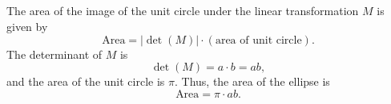 \documentclass{article}
\begin{document}
\subsection{}
The area of the image of the unit circle under the linear transformation $M$ is given by \[ \text{Area} = |\det(M)| \cdot (\text{area of unit circle}). \] The determinant of $M$ is \[ \det(M) = a \cdot b = ab, \] and the area of the unit circle is $\pi$. Thus, the area of the ellipse is \[ \text{Area} = \pi \cdot ab. \]
\end{document}
